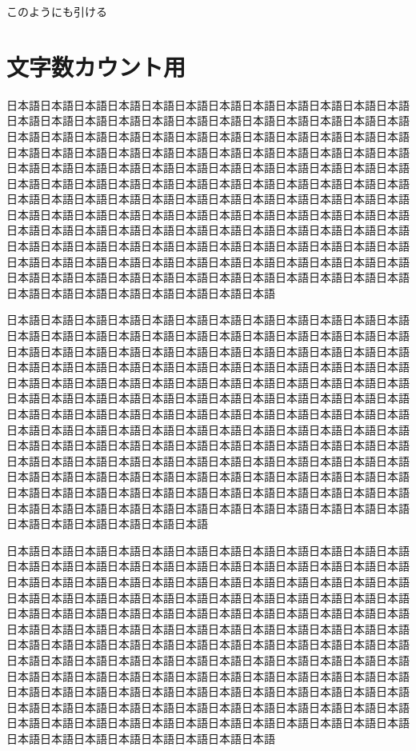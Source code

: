\documentclass{jsarticle}
\begin{document}
このようにも引ける\cite{Author1:08,Author2:09}

\section{文字数カウント用}

日本語日本語日本語日本語日本語日本語日本語日本語日本語日本語日本語日本語
日本語日本語日本語日本語日本語日本語日本語日本語日本語日本語日本語日本語
日本語日本語日本語日本語日本語日本語日本語日本語日本語日本語日本語日本語
日本語日本語日本語日本語日本語日本語日本語日本語日本語日本語日本語日本語
日本語日本語日本語日本語日本語日本語日本語日本語日本語日本語日本語日本語
日本語日本語日本語日本語日本語日本語日本語日本語日本語日本語日本語日本語
日本語日本語日本語日本語日本語日本語日本語日本語日本語日本語日本語日本語
日本語日本語日本語日本語日本語日本語日本語日本語日本語日本語日本語日本語
日本語日本語日本語日本語日本語日本語日本語日本語日本語日本語日本語日本語
日本語日本語日本語日本語日本語日本語日本語日本語日本語日本語日本語日本語
日本語日本語日本語日本語日本語日本語日本語日本語日本語日本語日本語日本語
日本語日本語日本語日本語日本語日本語日本語日本語日本語日本語日本語日本語
日本語日本語日本語日本語日本語日本語日本語日本語

日本語日本語日本語日本語日本語日本語日本語日本語日本語日本語日本語日本語
日本語日本語日本語日本語日本語日本語日本語日本語日本語日本語日本語日本語
日本語日本語日本語日本語日本語日本語日本語日本語日本語日本語日本語日本語
日本語日本語日本語日本語日本語日本語日本語日本語日本語日本語日本語日本語
日本語日本語日本語日本語日本語日本語日本語日本語日本語日本語日本語日本語
日本語日本語日本語日本語日本語日本語日本語日本語日本語日本語日本語日本語
日本語日本語日本語日本語日本語日本語日本語日本語日本語日本語日本語日本語
日本語日本語日本語日本語日本語日本語日本語日本語日本語日本語日本語日本語
日本語日本語日本語日本語日本語日本語日本語日本語日本語日本語日本語日本語
日本語日本語日本語日本語日本語日本語日本語日本語日本語日本語日本語日本語
日本語日本語日本語日本語日本語日本語日本語日本語日本語日本語日本語日本語
日本語日本語日本語日本語日本語日本語日本語日本語日本語日本語日本語日本語
日本語日本語日本語日本語日本語日本語日本語日本語日本語日本語日本語日本語
日本語日本語日本語日本語日本語日本語

日本語日本語日本語日本語日本語日本語日本語日本語日本語日本語日本語日本語
日本語日本語日本語日本語日本語日本語日本語日本語日本語日本語日本語日本語
日本語日本語日本語日本語日本語日本語日本語日本語日本語日本語日本語日本語
日本語日本語日本語日本語日本語日本語日本語日本語日本語日本語日本語日本語
日本語日本語日本語日本語日本語日本語日本語日本語日本語日本語日本語日本語
日本語日本語日本語日本語日本語日本語日本語日本語日本語日本語日本語日本語
日本語日本語日本語日本語日本語日本語日本語日本語日本語日本語日本語日本語
日本語日本語日本語日本語日本語日本語日本語日本語日本語日本語日本語日本語
日本語日本語日本語日本語日本語日本語日本語日本語日本語日本語日本語日本語
日本語日本語日本語日本語日本語日本語日本語日本語日本語日本語日本語日本語
日本語日本語日本語日本語日本語日本語日本語日本語日本語日本語日本語日本語
日本語日本語日本語日本語日本語日本語日本語日本語日本語日本語日本語日本語
日本語日本語日本語日本語日本語日本語日本語日本語
\end{document}
